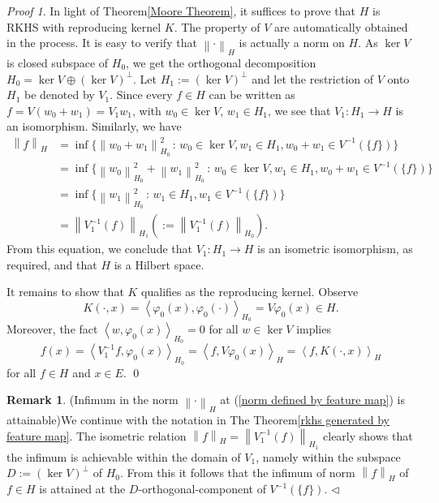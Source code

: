 \documentclass[a4paper,12pt]{article}
\theoremstyle{remark}
\newtheorem*{prf}{Proof}
\theoremstyle{definition}
\newtheorem{rem}[thm]{Remark}
\theoremstyle{definition}
\theoremstyle{definition}
\newcommand{\ip}[2]{\left<#1, #2 \right>}
\newcommand{\norm}[1]{\left\| #1 \right\|}
\newcommand{\fin}{\hfill \( \triangleleft \) }
\begin{document}
\begin{prf}
	In light of Theorem\ref{Moore Theorem}, it suffices to prove that \( H \) is RKHS with reproducing kernel \( K \). The property of \( V \) are automatically obtained in the process. It is easy to verify that \( \norm{\cdot }_H \) is actually a norm on \( H \). As \( \ker V \) is closed subspace of \( H_0 \), we get the orthogonal decomposition \( H_0 = \ker V \oplus \left( \ker V \right)^{\perp} \). Let \( H_1 := \left( \ker V \right)^{\perp} \) and let the restriction of \( V \) onto \( H_1 \) be denoted by \( V_1 \). Since every \( f \in H \) can be written as \( f = V(w_0+w_1) = V_1 w_1 \), with \( w_0 \in \ker V \), \( w_1 \in H_1 \),  we see that \( V_1 :H_1 \to H \) is an isomorphism. Similarly, we have
	\begin{equation*}
		\begin{aligned}
			\norm{f}_H
			 & = \inf \{ \norm{w_0+w_1}_{H_0} ^2 \,:\, w_0 \in \ker V, w_1 \in H_1, w_0 + w_1 \in V^{-1}(\{f\})\}                 \\
			 & = \inf \{ \norm{w_0}_{H_0}^2 + \norm{w_1}_{H_0}^2 \,:\, w_0 \in \ker V, w_1 \in H_1, w_0 + w_1 \in V^{-1}(\{f\})\} \\
			 & = \inf \{ \norm{w_1}_{H_0}^2 \,:\, w_1 \in H_1, w_1 \in V^{-1}(\{f\})\}                                            \\
			 & = \norm{V_1^{-1}(f)}_{H_1} \left( := \norm{V_1^{-1}(f)}_{H_0} \right).
		\end{aligned}
	\end{equation*}
	From this equation, we conclude that \( V_1 :H_1 \to H \) is an isometric isomorphism, as required, and that \( H \) is a Hilbert space.

	It remains to show that \( K \) qualifies as the reproducing kernel. Observe
	\begin{equation*}
		K(\cdot ,x) = \ip{\varphi_0(x)}{\varphi_0(\cdot )}_{H_0} = V \varphi_0(x)\in H.
	\end{equation*}
	Moreover, the fact \( \ip{w}{\varphi_0(x)}_{H_0} = 0 \) for all \( w \in \ker V \) implies
	\begin{equation*}
		f(x) = \ip{V_1^{-1}f}{\varphi_0(x)}_{H_0} = \ip{f}{V \varphi_0(x)}_H = \ip{f}{K(\cdot ,x)}_H
	\end{equation*}
	for all \( f \in H \) and \( x \in E \).
	\qed\end{prf}
\begin{rem} (Infimum in the norm \( \norm{\cdot }_H \) at (\ref{norm defined by feature map}) is attainable)\label{remark attainablity of norm induced by feature map}
	We continue with the notation in The Theorem\ref{rkhs generated by feature map}. The isometric relation \( \norm{f}_H = \norm{V_1^{-1}(f)}_{H_1}\) clearly shows that the infimum is achievable within the domain of \( V_1 \), namely within the subspace \( D:=(\ker V)^{\perp } \) of \( H_0 \). From this it follows that the infimum of norm \( \norm{f}_H \) of \( f \in H \) is attained at the \( D \)-orthogonal-component of \( V^{-1}(\{f\}) \).
	\fin\end{rem}
\end{document}
